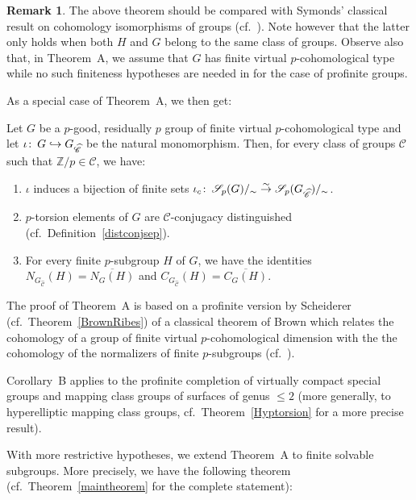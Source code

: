 \documentclass[12pt,twoside]{amsart}
\newcommand\Z{{\mathbb Z}}
\newcommand\hookra{\hookrightarrow}
\newcommand\sr{\stackrel}
\newcommand\ol{\overline}
\newcommand\cC{{\mathscr C}}
\newcommand\cS{{\mathscr S}}
\newcommand\wh{\widehat}
\def\co{\colon\thinspace}
\def\wC{{\widehat{\cC}}}
\newenvironment{customcorollary}[1]
  {\renewcommand\theinnercustomcor{#1}\innercustomcor}
  {\endinnercustomcor}
\theoremstyle{definition}
\newtheorem{remark}[theorem]{Remark}
\begin{document}
\begin{remark}\label{Symonds}The above theorem should be compared with Symonds' classical result on cohomology isomorphisms of groups 
(cf.\ \cite[Theorem~1.1]{Symonds}). Note however that the latter only holds when both $H$ and $G$ belong to the same class of groups. 
Observe also that, in Theorem~A, we assume that $G$ has finite virtual $p$-cohomological type while no such finiteness hypotheses are needed 
in \cite[Theorem~1.1]{Symonds} for the case of profinite groups.
\end{remark}

As a special case of Theorem~A, we then get:

\begin{customcorollary}{B}Let $G$ be a $p$-good, residually $p$ group of finite virtual $p$-cohomological type 
and let $\iota\co G\hookra G_{\wC}$ be the natural monomorphism. Then, for every class of groups $\cC$ such that $\Z/p\in\cC$, we have:
\begin{enumerate}
\item $\iota$ induces a bijection of finite sets $\iota_c\co\cS_p(G)/_{\sim}\sr{\sim}{\to}\cS_p(G_{\wC})/_{\sim}$.  
\item $p$-torsion elements of $G$ are $\cC$-conjugacy distinguished (cf.\ Definition~\ref{distconjsep}).
\item For every finite $p$-subgroup $H$ of $G$, we have the identities $N_{G_\wC}(H)=\ol{N_G(H)}$ and $C_{G_\wC}(H)=\ol{C_G(H)}$.
\end{enumerate}
\end{customcorollary}

The proof of Theorem~A is based on a profinite version by Scheiderer (cf.\ Theorem~\ref{BrownRibes}) of a classical theorem of Brown
which relates the cohomology of a group of finite virtual $p$-cohomological dimension with the the cohomology of the normalizers of 
finite $p$-subgroups (cf.\ \cite[Corollary~7.4 in Chapter~X]{Brown}). 

Corollary~B applies to the profinite completion of virtually compact special groups and mapping class groups of surfaces of genus $\leq 2$
(more generally, to hyperelliptic mapping class groups, cf.\ Theorem~\ref{Hyptorsion} for a more precise result).

With more restrictive hypotheses, we extend Theorem~A to finite solvable subgroups.
More precisely, we have the following theorem (cf.\ Theorem~\ref{maintheorem} for the complete statement):
\end{document}
